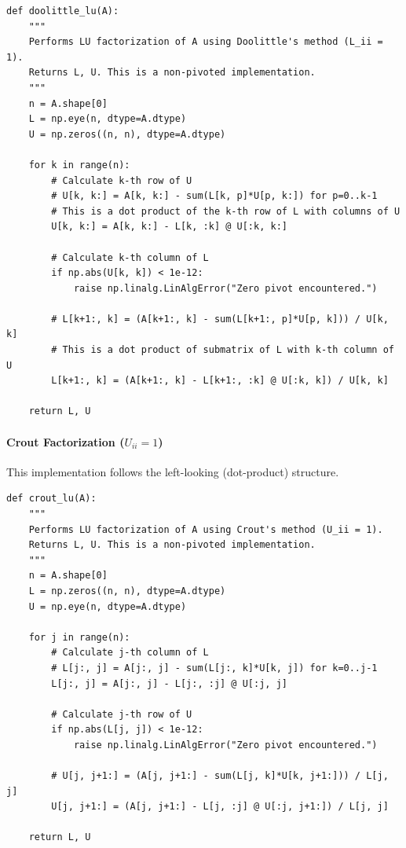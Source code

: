 \begin{verbatim}
def doolittle_lu(A):
    """
    Performs LU factorization of A using Doolittle's method (L_ii = 1).
    Returns L, U. This is a non-pivoted implementation.
    """
    n = A.shape[0]
    L = np.eye(n, dtype=A.dtype)
    U = np.zeros((n, n), dtype=A.dtype)

    for k in range(n):
        # Calculate k-th row of U
        # U[k, k:] = A[k, k:] - sum(L[k, p]*U[p, k:]) for p=0..k-1
        # This is a dot product of the k-th row of L with columns of U
        U[k, k:] = A[k, k:] - L[k, :k] @ U[:k, k:]

        # Calculate k-th column of L
        if np.abs(U[k, k]) < 1e-12:
            raise np.linalg.LinAlgError("Zero pivot encountered.")
        
        # L[k+1:, k] = (A[k+1:, k] - sum(L[k+1:, p]*U[p, k])) / U[k, k]
        # This is a dot product of submatrix of L with k-th column of U
        L[k+1:, k] = (A[k+1:, k] - L[k+1:, :k] @ U[:k, k]) / U[k, k]
        
    return L, U
\end{verbatim}

\paragraph{Crout Factorization ($U_{ii} = 1$)}
This implementation follows the left-looking (dot-product) structure.

\begin{verbatim}
def crout_lu(A):
    """
    Performs LU factorization of A using Crout's method (U_ii = 1).
    Returns L, U. This is a non-pivoted implementation.
    """
    n = A.shape[0]
    L = np.zeros((n, n), dtype=A.dtype)
    U = np.eye(n, dtype=A.dtype)

    for j in range(n):
        # Calculate j-th column of L
        # L[j:, j] = A[j:, j] - sum(L[j:, k]*U[k, j]) for k=0..j-1
        L[j:, j] = A[j:, j] - L[j:, :j] @ U[:j, j]

        # Calculate j-th row of U
        if np.abs(L[j, j]) < 1e-12:
            raise np.linalg.LinAlgError("Zero pivot encountered.")
            
        # U[j, j+1:] = (A[j, j+1:] - sum(L[j, k]*U[k, j+1:])) / L[j, j]
        U[j, j+1:] = (A[j, j+1:] - L[j, :j] @ U[:j, j+1:]) / L[j, j]
        
    return L, U
\end{verbatim}


